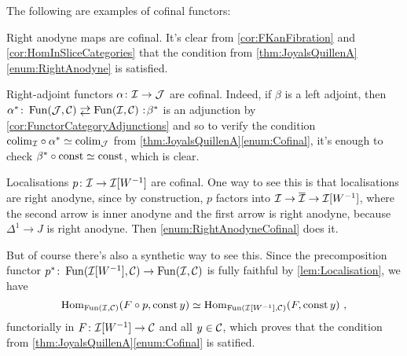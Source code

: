 \begin{exm}\label{exm:Cofinal}
	The following are examples of cofinal functors:
	\begin{alphanumerate}
		\item Right anodyne maps are cofinal. It's clear from \cref{cor:FKanFibration} and \cref{cor:HomInSliceCategories} that the condition from \cref{thm:JoyalsQuillenA}\cref{enum:RightAnodyne} is satisfied.\label{enum:RightAnodyneCofinal}
		\item Right-adjoint functors $\alpha\colon \mathcal{I}\rightarrow\mathcal{J}$ are cofinal. Indeed, if $\beta$ is a left adjoint, then $\alpha^*\colon \Fun(\Jj,\Cc)\shortdoublelrmorphism \Fun(\Ii,\Cc)\noloc \beta^*$ is an adjunction by \cref{cor:FunctorCategoryAdjunctions} and so to verify the condition ${\operatorname*{colim}_{\mathcal{I}}}\circ{\alpha^*}\simeq \operatorname*{colim}_{\mathcal{J}}$ from \cref{thm:JoyalsQuillenA}\cref{enum:Cofinal}, it's enough to check ${\beta^*}\circ{\operatorname{const}}\simeq\operatorname{const}$, which is clear.\label{enum:RightAdjointCofinal}
		\item Localisations $p\colon \mathcal{I}\rightarrow \mathcal{I}[W^{-1}]$ are cofinal. One way to see this is that localisations are right anodyne, since by construction, $p$ factors into $\Ii\rightarrow\ov{\Ii}\rightarrow \Ii[W^{-1}]$, where the second arrow is inner anodyne and the first arrow is right anodyne, because $\Delta^1\rightarrow J$ is right anodyne. Then \cref{enum:RightAnodyneCofinal} does it.\label{enum:LocalisationsCofinal}
		
		But of course there's also a synthetic way to see this. Since the precomposition functor $p^*\colon\operatorname{Fun}(\mathcal{I}[W^{-1}],\mathcal{C})\rightarrow \operatorname{Fun}(\mathcal{I},\mathcal{C})$ is fully faithful by \cref{lem:Localisation}, we have
		\begin{equation*}
			\operatorname{Hom}_{\operatorname{Fun}(\mathcal{I},\mathcal{C})}\!\left(F\circ p,\operatorname{const} y\right)\simeq \operatorname{Hom}_{\operatorname{Fun}(\mathcal{I}[W^{-1}],\mathcal{C})}\!\left(F,\operatorname{const} y\right)\,,
		\end{equation*}
		functorially in $F\colon \mathcal{I}[W^{-1}]\rightarrow \mathcal{C}$ and all $y\in \mathcal{C}$, which proves that the condition from \cref{thm:JoyalsQuillenA}\cref{enum:Cofinal} is satified.
	\end{alphanumerate}
\end{exm}
